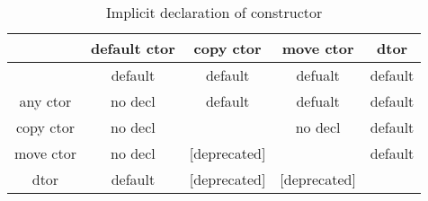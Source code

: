\begin{table}[tb]
  \begin{center}
  \caption{Implicit declaration of constructor\cite{decl2016}}
  \label{tb:decl}
  \begin{tabular}{|c||c|c|c|c|}\hline
      & default ctor & copy ctor & move ctor & dtor \\ \hline \hline
      & default & default & defualt & default \\ \hline
      any ctor & no decl & default & defualt & default \\ \hline
      copy ctor & no decl & & no decl & default \\ \hline
      move ctor & no decl & [deprecated] & & default \\ \hline
      dtor & default & [deprecated] & [deprecated] & \\ \hline
  \end{tabular}
  \end{center}
\end{table}

